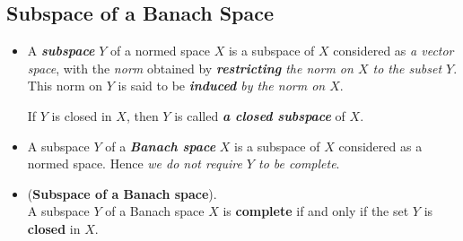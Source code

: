 \documentclass[11pt]{article}
\begin{document}
\subsection{Subspace of a Banach Space}
\begin{itemize}
\item \begin{definition}
A \emph{\textbf{subspace}} $Y$ of a normed space $X$ is a subspace of $X$ considered as \emph{a vector space}, with the \emph{norm} obtained by \emph{\textbf{restricting} the norm on $X$ to the subset $Y$}. This norm on $Y$ is said to be \emph{\textbf{induced} by the norm on $X$}. 

If $Y$ is closed in $X$, then $Y$ is called \emph{\textbf{a closed subspace}} of $X$.
\end{definition}

\item \begin{remark}
A subspace $Y$ of a \emph{\textbf{Banach space}} $X$ is a subspace of $X$ considered as a normed space. Hence \emph{we do not require $Y$ to be complete}. 
\end{remark}

\item \begin{proposition}(\textbf{Subspace of a Banach space}). \citep{kreyszig1989introductory} \\
 A subspace $Y$ of a Banach space $X$ is \textbf{complete} if and only if the set $Y$ is \textbf{closed} in $X$.
\end{proposition}
\end{itemize}
\end{document}
